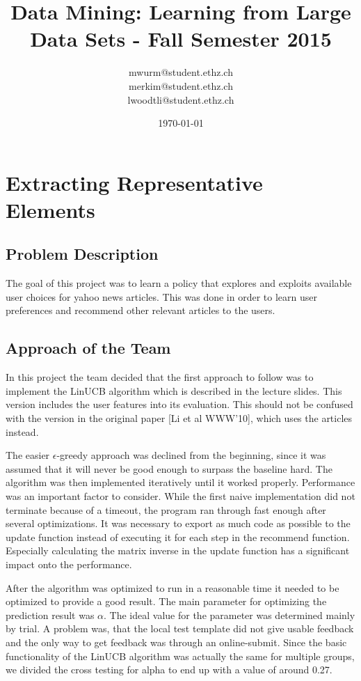 \documentclass[a4paper, 11pt]{article}
\title{Data Mining: Learning from Large Data Sets - Fall Semester 2015}
\author{mwurm@student.ethz.ch\\ merkim@student.ethz.ch\\ lwoodtli@student.ethz.ch\\}
\date{\today}
\begin{document}
\maketitle

\section*{Extracting Representative Elements} 

\subsection{Problem Description}
The goal of this project was to learn a policy that explores and exploits available user choices for yahoo news articles. This was done in order to learn user preferences and recommend other relevant articles to the users.

\subsection{Approach of the Team}
In this project the team decided that the first approach to follow was to implement the LinUCB algorithm which is described in the lecture slides. This version includes the user features into its evaluation. This should not be confused with the version in the original paper [Li et al WWW'10],  which uses the articles instead.

The easier $\epsilon$-greedy approach was declined from the beginning, since it was assumed that it will never be good enough to surpass the baseline hard.
The algorithm was then implemented iteratively until it worked properly.
Performance was an important factor to consider. While the first naive implementation did not terminate because of a timeout, the program ran through fast enough after several optimizations. It was necessary to export as much code as possible to the update function instead of executing it for each step in the recommend function. Especially calculating the matrix inverse in the update function has a significant impact onto the performance.

After the algorithm was optimized to run in a reasonable time it needed to be optimized to provide a good result. The main parameter for optimizing the prediction result was $\alpha$. The ideal value for the parameter was determined mainly by trial. A problem was, that the local test template did not give usable feedback and the only way to get feedback was through an online-submit. Since the basic functionality of the LinUCB algorithm was actually the same for multiple groups, we divided the cross testing for alpha to end up with a value of around 0.27.
\end{document}
